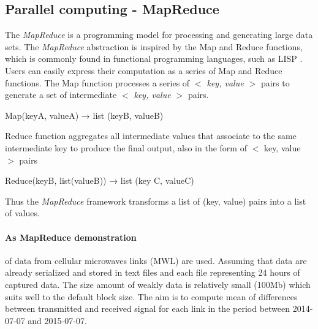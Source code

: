 \documentclass[a4paper,12pt,oneside]{report}
\begin{document}
	
	\subsection{Parallel computing - MapReduce}		
	The \emph{MapReduce} is a programming model for processing and generating large
	data
	sets. The \emph{MapReduce} abstraction is inspired by the Map and Reduce
	functions, which is commonly
	found in functional programming languages, such as LISP \cite{lisp}. Users can
	easily express their
	computation as a series of Map and Reduce functions. The Map function processes
	a series of
	\textit{$<$ key, value $>$} pairs to generate a set of intermediate \textit{$<$
		key, value $>$} pairs.
	\begin{center}
		Map(keyA, valueA) → list (keyB, valueB)
	\end{center}
	Reduce function aggregates all intermediate values that associate to the same
	intermediate key
	to produce the final output, also in the form of $<$ key, value $>$ pairs
	\begin{center}
		Reduce(keyB, list(valueB)) → list (key C, valueC)
	\end{center}
	Thus the \emph{MapReduce} framework transforms a list of (key, value) pairs into
	a list of values. 
	
	
	\paragraph{As MapReduce demonstration} of  data from cellular microwaves
	links (MWL) are used.
	Assuming that data are already serialized and stored in text files and each file
	representing 24 hours 
	of captured data. The size amount of weakly data is relatively small (100Mb)
	which suits well to the default block size.
	The aim is to compute  mean of differences between transmitted and received
	signal for 
	each link in the period between 2014-07-07 and 2015-07-07.
	
\end{document}
